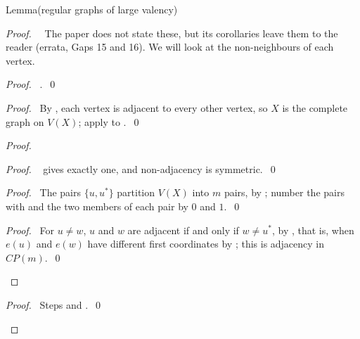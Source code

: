 \begin{namedresult}{Lemma}{(regular graphs of large valency)}\label{lem:dense}
\end{namedresult}
\begin{proof}
 \pfsketch\ \repair\ The paper does not state these, but its corollaries leave them to the
 reader (errata, Gaps 15 and 16). We will look at the non-neighbours of each vertex.
 \begin{proof}\pf\ .~\qed\end{proof}
 \begin{proof}\pf\ By , each vertex is adjacent to every other vertex, so
  $X$ is the complete graph on $V(X)$; apply  to
  .~\qed\end{proof}
 \begin{proof}
  \begin{proof}\pf\  gives exactly one, and non-adjacency is
   symmetric.~\qed\end{proof}
  \begin{proof}\pf\ The pairs $\{u,u^*\}$ partition $V(X)$ into $m$ pairs, by
   ; number the pairs with  and the two members of
   each pair by $0$ and $1$.~\qed\end{proof}
  \qedstep
  \begin{proof}\pf\ For $u\ne w$, $u$ and $w$ are adjacent if and only if $w\ne u^*$, by
   , that is, when $e(u)$ and $e(w)$ have different first coordinates by
   ; this is adjacency in $CP(m)$.~\qed\end{proof}
 \end{proof}
 \qedstep
 \begin{proof}\pf\ Steps  and .~\qed\end{proof}
\end{proof}

